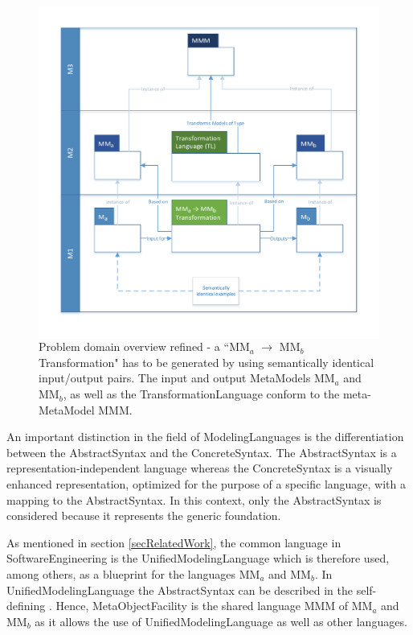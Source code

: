 \begin{figure}[htb]
	\centering
	\includegraphics[scale=0.76, trim=0cm 1cm 0cm 1cm, clip=true]{Images/ProblemDomainOverviewRefined.pdf} 
	\caption{Problem domain overview refined - a ``MM$_a$ $\rightarrow$ MM$_b$ Transformation" has to be generated by using semantically identical input/output pairs. The input and output \glspl{MetaModel} MM$_a$ and MM$_b$, as well as the \gls{TransformationLanguage} conform to the meta-\gls{MetaModel} MMM.}
	\label{figProblemDomainOverviewRefined}
\end{figure}

An important distinction in the field of \glspl{ModelingLanguage} is the differentiation between the \gls{AbstractSyntax} and the \gls{ConcreteSyntax}. The \gls{AbstractSyntax} is a representation-independent language whereas the \gls{ConcreteSyntax} is a visually enhanced representation, optimized for the purpose of a specific language, with a mapping to the \gls{AbstractSyntax}. In this context, only the \gls{AbstractSyntax} is considered because it represents the generic foundation. 

As mentioned in section \ref{secRelatedWork}, the common language in \gls{SoftwareEngineering} is the \gls{UnifiedModelingLanguage} which is therefore used, among others, as a blueprint for the languages MM$_a$ and MM$_b$. In \gls{UnifiedModelingLanguage} the \gls{AbstractSyntax} can be described in the self-defining . Hence, \gls{MetaObjectFacility} is the shared language MMM of MM$_a$ and MM$_b$ as it allows the use of \gls{UnifiedModelingLanguage} as well as other languages. 

